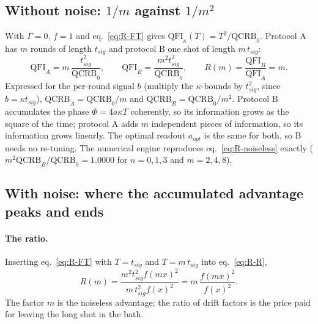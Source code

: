 \subsection{Without noise: $1/m$ against $1/m^2$}
\label{sec:rep-noiseless}

With $\Gamma = 0$, $f = 1$ and eq.~\eqref{eq:R-FT} gives $\mathrm{QFI}_\kappa(T) = T^2/\mathrm{QCRB}_0$. Protocol A has $m$ rounds of length $t_{sig}$ and protocol B one shot of length $m\,t_{sig}$:
\begin{equation}
\label{eq:R-noiseless}
    \mathrm{QFI}_A = m\,\frac{t_{sig}^2}{\mathrm{QCRB}_0},
    \qquad
    \mathrm{QFI}_B = \frac{m^2t_{sig}^2}{\mathrm{QCRB}_0},
    \qquad
    R(m) = \frac{\mathrm{QFI}_B}{\mathrm{QFI}_A} = m .
\end{equation}
Expressed for the per-round signal $b$ (multiply the $\kappa$-bounds by $t_{sig}^2$, since $b = \kappa t_{sig}$), $\mathrm{QCRB}_A = \mathrm{QCRB}_0/m$ and $\mathrm{QCRB}_B = \mathrm{QCRB}_0/m^2$. Protocol B accumulates the phase $\Phi = 4a\kappa T$ coherently, so its information grows as the square of the time; protocol A adds $m$ independent pieces of information, so its information grows linearly. The optimal readout $a_{opt}$ is the same for both, so B needs no re-tuning. The numerical engine reproduces eq.~\eqref{eq:R-noiseless} exactly ($m^2\mathrm{QCRB}_B/\mathrm{QCRB}_0 = 1.0000$ for $n = 0, 1, 3$ and $m = 2, 4, 8$).

\subsection{With noise: where the accumulated advantage peaks and ends}
\label{sec:rep-leaky}

\paragraph{The ratio.} Inserting eq.~\eqref{eq:R-FT} with $T = t_{sig}$ and $T = m\,t_{sig}$ into eq.~\eqref{eq:R-R},
\begin{equation}
\label{eq:R-Rleaky}
    R(m) = \frac{m^2t_{sig}^2 f(mx)^2}{m\,t_{sig}^2 f(x)^2} = m\,\frac{f(mx)^2}{f(x)^2}.
\end{equation}
The factor $m$ is the noiseless advantage; the ratio of drift factors is the price paid for leaving the long shot in the bath.


